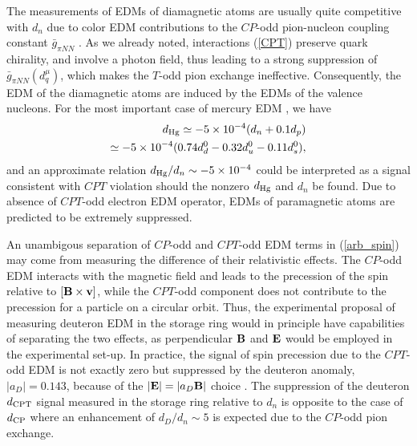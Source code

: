 \documentclass[prl,twocolumn,tightenlines,preprintnumbers,floatfix,nofootinbib]{revtex4}
\def\ba{\begin{eqnarray}}
\def\ea{\end{eqnarray}}
\begin{document}
The measurements of EDMs of diamagnetic atoms are usually 
quite competitive with $d_n$ due to 
color EDM contributions to the $CP$-odd pion-nucleon 
coupling constant $\bar g_{\pi NN}$ \cite{KL,PRann}. 
As we already noted, interactions (\ref{CPT}) preserve quark chirality, and 
involve a photon field, thus leading to a strong suppression of $\bar g_{\pi NN}(d^\mu_q)$, 
which makes the $T$-odd pion exchange ineffective. 
Consequently, the EDM of the diamagnetic atoms are induced by
the EDMs of the valence nucleons.
For the most important case of mercury EDM \cite{DS}, we have
\ba
d_{\rm Hg} \simeq - 5\times 10^{-4}(d_n + 0.1 d_p)\nonumber\\\simeq
-5\times 10^{-4}(0.74 d_d^0 -0.32 d_u^0 - 0.11 d_s^0),
\label{dHg}
\ea
and an approximate relation $d_{\rm Hg}/d_n \sim - 5\times 10^{-4}$ could be 
interpreted as a signal consistent with $CPT$ violation should the nonzero 
$d_{\rm Hg}$ and $d_n$ be found. Due to absence of $CPT$-odd electron 
EDM operator, EDMs of paramagnetic atoms are predicted to be extremely suppressed. 



An unambigous separation of $CP$-odd and $CPT$-odd EDM terms in (\ref{arb_spin}) 
may come from measuring the difference of their relativistic effects. 
The $CP$-odd EDM interacts with the magnetic field 
and leads to the precession of the spin relative to $[{\bf B}\times{\bf v}]$, while the 
$CPT$-odd component does not contribute to the precession for a particle on a circular orbit. 
Thus, the experimental proposal of measuring deuteron EDM in the storage ring \cite{Deut} 
would in principle have capabilities of separating the two effects, as perpendicular ${\bf B}$  and ${\bf E}$ 
would be employed in the experimental set-up. In practice, the signal of  
spin precession due to the $ CPT $-odd EDM is not exactly zero but 
suppressed by the deuteron anomaly, $ |a_D| = 0.143$, 
because of the $|{\bf E}|=|a_D{\bf B}|$ choice \cite{Deut}. The suppression of the deuteron $d_{\rm CPT}$ signal 
measured in the storage ring relative to $d_n$ is opposite to the case of $ d_{\rm CP} $ where an
enhancement of $d_D/d_n \sim 5 $ is expected \cite{LOPR} due to the $CP$-odd pion exchange.
\end{document}
